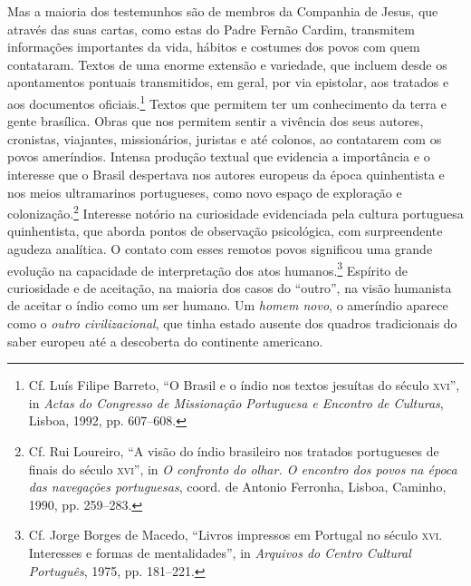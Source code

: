 Mas a maioria dos testemunhos são de membros da Companhia de Jesus,
que através das suas cartas, como estas do Padre Fernão Cardim,
transmitem informações importantes da vida, hábitos e costumes dos
povos com quem contataram. Textos de uma enorme extensão e variedade,
que incluem desde os apontamentos pontuais transmitidos, em geral, por
via epistolar, aos tratados e aos documentos oficiais.\footnote{ Cf. Luís 
Filipe Barreto, ``O Brasil e o índio nos textos jesuítas do
século \textsc{xvi}'', in \textit{Actas do Congresso de Missionação Portuguesa e
Encontro de Culturas}, Lisboa, 1992, pp. 607--608.} Textos que permitem
ter um conhecimento da terra e gente brasílica. 
Obras que nos permitem sentir a vivência dos seus autores, cronistas,
viajantes, missionários, juristas e até colonos, ao contatarem com os
povos ameríndios. Intensa produção textual que evidencia a importância
e o interesse que o Brasil despertava nos autores europeus da época
quinhentista e nos meios ultramarinos portugueses, como novo espaço de
exploração e colonização.\footnote{ Cf. Rui Loureiro, ``A visão
do índio brasileiro nos tratados portugueses de finais do século \textsc{xvi}'',
in \textit{O confronto do olhar. O encontro dos povos na época das
navegações portuguesas}, coord. de Antonio Ferronha, Lisboa, Caminho,
1990, pp. 259--283.} Interesse notório na curiosidade evidenciada pela cultura portuguesa
quinhentista, que aborda pontos de observação psicológica, com
surpreendente agudeza analítica. O contato com esses remotos povos
significou uma grande evolução na capacidade de interpretação dos atos
humanos.\footnote{ Cf. Jorge Borges de Macedo, ``Livros impressos
em Portugal no século \textsc{xvi}. Interesses e formas de mentalidades'', in
\textit{Arquivos do Centro Cultural Português}, 1975, pp. 181--221.}
Espírito de curiosidade e de aceitação, na maioria dos casos do
``outro'', na visão humanista de aceitar o índio como um ser humano. Um
\textit{homem novo}, o ameríndio aparece como o \textit{outro
civilizacional}, que tinha estado ausente dos quadros tradicionais do
saber europeu até a descoberta do continente americano.

